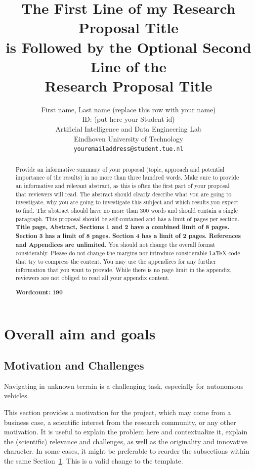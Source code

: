 \documentclass{article}
\title{The First Line of my Research Proposal Title\\is Followed by the Optional Second Line of the\\Research Proposal Title}
\author{
 First name, Last name (replace this row with your name) \\
 ID: (put here your Student id)\\
 Artificial Intelligence and Data Engineering Lab\\
Eindhoven University of Technology\\
  \texttt{youremailaddress@student.tue.nl} \\
}
\begin{document}
\maketitle
\begin{abstract}
  Provide an informative summary of your proposal (topic, approach and potential importance of the results) in no more than three hundred words.
  Make sure to provide an informative and relevant abstract, as this is often the first part of your proposal that reviewers will read. The abstract should clearly describe what you are going to investigate, why you are going to investigate this subject and which results you expect to find.
  The abstract should have no more than 300 words and should contain a single paragraph.
  This proposal should be self-contained and has a limit of pages per section. \textbf{Title page, Abstract, Sections 1 and 2 have a combined limit of 8 pages. Section 3 has a limit of 8 pages. Section 4 has a limit of 2 pages. References and Appendices are unlimited.} You should not change the overall format considerably. Please do not change the margins nor introduce considerable LaTeX code that try to compress the content. You may use the appendices for any further information that you want to provide. While there is no page limit in the appendix, reviewers are not obliged to read all your appendix content.

  \noindent\textbf{Wordcount: 190}
\end{abstract}

\section{Overall aim and goals}
\label{sec:goals}
\subsection{Motivation and Challenges}

Navigating in unknown terrain is a challenging task, especially for autonomous vehicles. 

This section provides a motivation for the project, which may come from a business case, a scientific interest from the research community, or any other motivation. It is useful to explain the problem here and contextualize it, explain the (scientific) relevance and challenges, as well as the originality and innovative character. In some cases, it might be preferable to reorder the subsections within the same Section~\ref{sec:goals}. This is a valid change to the template.
\end{document}

